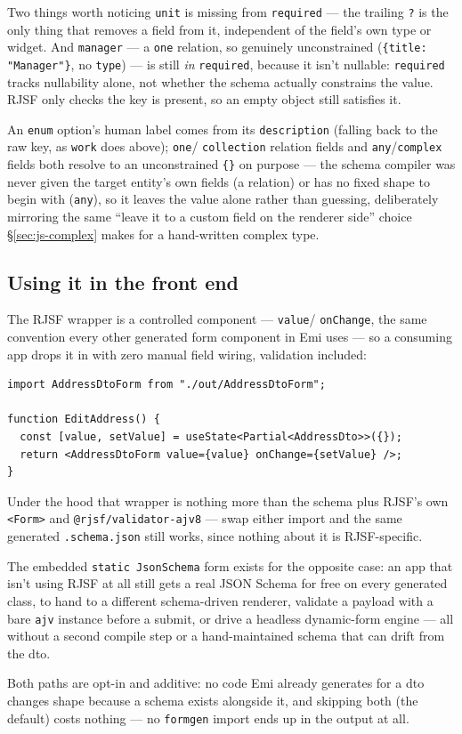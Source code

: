 \begin{sidebar}{Two things worth noticing}
\texttt{unit} is missing from \texttt{required} --- the trailing
\texttt{?} is the only thing that removes a field from it, independent
of the field's own type or widget. And \texttt{manager} --- a
\texttt{one} relation, so genuinely unconstrained (\texttt{\{title:
"Manager"\}}, no \texttt{type}) --- is still \emph{in} \texttt{required},
because it isn't nullable: \texttt{required} tracks nullability alone,
not whether the schema actually constrains the value. RJSF only checks
the key is present, so an empty object still satisfies it.
\end{sidebar}

An \texttt{enum} option's human label comes from its \texttt{description}
(falling back to the raw key, as \texttt{work} does above); \texttt{one}/
\texttt{collection} relation fields and \texttt{any}/\texttt{complex}
fields both resolve to an unconstrained \texttt{\{\}} on purpose --- the
schema compiler was never given the target entity's own fields (a
relation) or has no fixed shape to begin with (\texttt{any}), so it
leaves the value alone rather than guessing, deliberately mirroring the
same ``leave it to a custom field on the renderer side'' choice
\S\ref{sec:js-complex} makes for a hand-written complex type.

\subsection{Using it in the front end}
The RJSF wrapper is a controlled component --- \texttt{value}/
\texttt{onChange}, the same convention every other generated form
component in Emi uses --- so a consuming app drops it in with zero
manual field wiring, validation included:
\begin{lstlisting}
import AddressDtoForm from "./out/AddressDtoForm";

function EditAddress() {
  const [value, setValue] = useState<Partial<AddressDto>>({});
  return <AddressDtoForm value={value} onChange={setValue} />;
}
\end{lstlisting}
Under the hood that wrapper is nothing more than the schema plus RJSF's
own \texttt{<Form>} and \texttt{@rjsf/validator-ajv8} --- swap either
import and the same generated \texttt{.schema.json} still works, since
nothing about it is RJSF-specific.

The embedded \texttt{static JsonSchema} form exists for the opposite
case: an app that isn't using RJSF at all still gets a real JSON Schema
for free on every generated class, to hand to a different schema-driven
renderer, validate a payload with a bare \texttt{ajv} instance before a
submit, or drive a headless dynamic-form engine --- all without a second
compile step or a hand-maintained schema that can drift from the dto.

\begin{pullquote}
Both paths are opt-in and additive: no code Emi already generates for a
dto changes shape because a schema exists alongside it, and skipping
both (the default) costs nothing --- no \texttt{formgen} import ends up
in the output at all.
\end{pullquote}
